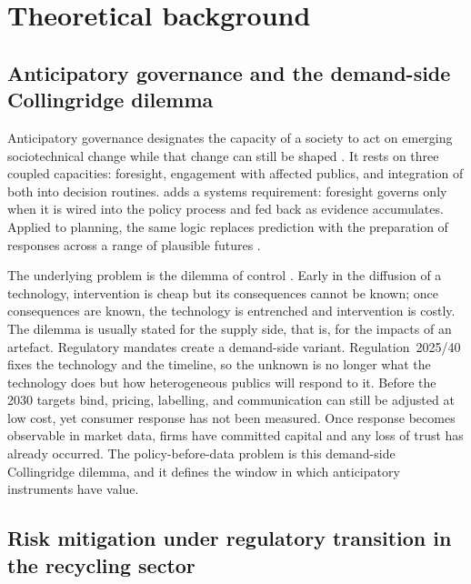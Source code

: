 \section{Theoretical background}
\label{sec:theory}

\subsection{Anticipatory governance and the demand-side Collingridge dilemma}

Anticipatory governance designates the capacity of a society to act on
emerging sociotechnical change while that change can still be shaped
\citep{barben2008,guston2014}. It rests on three coupled capacities: foresight,
engagement with affected publics, and integration of both into decision
routines. \citet{fuerth2009} adds a systems requirement: foresight governs only
when it is wired into the policy process and fed back as evidence accumulates.
Applied to planning, the same logic replaces prediction with the preparation of
responses across a range of plausible futures \citep{quay2010}.

The underlying problem is the dilemma of control \citep{collingridge1980}.
Early in the diffusion of a technology, intervention is cheap but its
consequences cannot be known; once consequences are known, the technology is
entrenched and intervention is costly. The dilemma is usually stated for the
supply side, that is, for the impacts of an artefact. Regulatory mandates
create a demand-side variant. Regulation~2025/40 fixes the technology and the
timeline, so the unknown is no longer what the technology does but how
heterogeneous publics will respond to it. Before the 2030 targets bind,
pricing, labelling, and communication can still be adjusted at low cost, yet
consumer response has not been measured. Once response becomes observable in
market data, firms have committed capital and any loss of trust has already
occurred. The policy-before-data problem is this demand-side Collingridge
dilemma, and it defines the window in which anticipatory instruments have
value.

\subsection{Risk mitigation under regulatory transition in the recycling sector}

